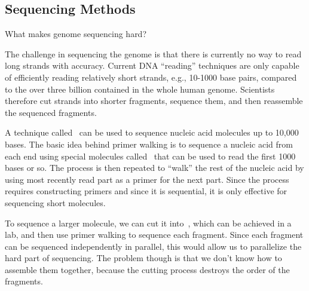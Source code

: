 




\subsection{Sequencing Methods}


\begin{teachask}
What makes genome sequencing hard?
\end{teachask}
%

\begin{gram}
The challenge in sequencing the genome is that there is currently
no way to read long strands with accuracy. 
%
Current DNA ``reading'' techniques are only capable of efficiently
reading relatively short strands, e.g., 10-1000 base pairs, compared
to the over three billion contained in the whole human genome.
%
Scientists therefore cut strands into shorter fragments, sequence
them, and then reassemble the sequenced fragments.
%
\end{gram}


\begin{gram}  
A technique called~ can be used to sequence
nucleic acid molecules up to 10,000 bases.  
%
The basic idea behind primer walking is to sequence a nucleic acid
from each end using special molecules called~ that can
be used to read the first 1000 bases or so.
%
The process is then repeated to ``walk'' the rest of the nucleic acid
by using most recently read part as a primer for the next part.
%
Since the process requires constructing primers and since it is
sequential, it is only effective for sequencing short molecules.
\end{gram}


%

\begin{gram}[Fragments]
To sequence a larger molecule, we can cut it into~,
which can be achieved in a lab, and then use primer walking to sequence
each fragment.
%
Since each fragment can be sequenced independently in parallel, this
would allow us to parallelize the hard part of sequencing.
%
The problem though is that we don't know how to assemble them
together, because the cutting process destroys the order of the
fragments.
%
%
\end{gram}

